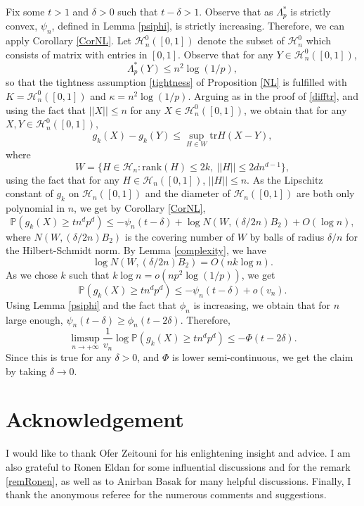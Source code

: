 \documentclass[aop,preprint]{imsart}
\newcommand\PP{\mathbb{P}}
\newcommand\tr{\mathrm{tr}}
\newcommand\rk{\mathrm{rank}}
\numberwithin{equation}{section}
\theoremstyle{definition}
\theoremstyle{plain}
\theoremstyle{remark}
\begin{document}
 Fix some $t>1$ and $\delta>0$ such that $t-\delta> 1$.
Observe that as $\Lambda_p^*$ is strictly convex, $\psi_{n}$, defined in Lemma \ref{psiphi}, is strictly increasing.  
Therefore, we can apply Corollary \ref{CorNL}. Let $\mathcal{H}_n^0([0,1])$ denote the subset of $\mathcal{H}_n^0$ which consists of matrix with entries in $[0,1]$. Observe that for any $Y\in\mathcal{H}_n^0([0,1])$, 
$$\Lambda^*_p(Y) \leq n^2 \log(1/p),$$
 so that the tightness assumption \eqref{tightness} of Proposition \ref{NL} is fulfilled with $K = \mathcal{H}_n^0([0,1])$ and $\kappa=n^2\log (1/p)$. Arguing as in the proof of \eqref{difftr}, and using the fact that $||X||\leq n$ for any $X\in \mathcal{H}_n^0([0,1])$, we obtain that for any $X,Y \in \mathcal{H}_n^0([0,1])$,
$$g_k(X) - g_k(Y) \leq \sup_{ H \in W}  \tr H(X-Y),$$
where 
$$ W = \big\{ H \in \mathcal{H}_n : \rk(H) \leq 2k, \ || H|| \leq 2dn^{d-1}\big\},$$
using the fact that for any $H \in\mathcal{H}_n([0,1])$, $|| H|| \leq n$.
As the Lipschitz constant of $g_k$ on $\mathcal{H}_n([0,1])$  and the diameter of $\mathcal{H}_n([0,1])$ are both only polynomial in $n$, we get by Corollary \ref{CorNL}, 
$$\PP( g_k(X)\geq tn^dp^d ) \leq - \psi_{n}(t-\delta) + \log N(W, (\delta/2n) B_{2}) + O(\log n),$$
 where $N(W, (\delta/2n) B_{2})$ is the covering number of $W$ by balls of radius $\delta/n$ for the Hilbert-Schmidt norm. By Lemma \ref{complexity}, we have
$$\log  N(W, (\delta/2n) B_{2}) = O(nk \log n).$$
As we chose $k$ such that $k\log n  = o(np^2\log (1/p))$, we get
$$\PP( g_k(X)\geq tn^dp^d ) \leq - \psi_{n}(t-\delta) +o(v_n).$$
Using Lemma \ref{psiphi} and the fact that $\phi_n$ is increasing, we obtain that for $n$ large enough, $\psi_{n}(t-\delta) \geq \phi_n(t-2\delta)$. Therefore,
$$\limsup_{n\to +\infty} \frac{1}{v_n} \log \PP( g_k(X)\geq tn^dp^d ) \leq - \Phi(t-2\delta).$$
Since this is true for any $\delta>0$, and $\Phi$ is lower semi-continuous, we get the claim by taking $\delta \to 0$.



\section*{Acknowledgement} I would like to thank Ofer Zeitouni for his enlightening insight and advice. I am also grateful to Ronen Eldan for some influential discussions and for the remark \ref{remRonen}, as well as to Anirban Basak for many helpful discussions. Finally, I thank the anonymous referee for the numerous comments and suggestions.






%
%
%
%
%




{}
\end{document}
